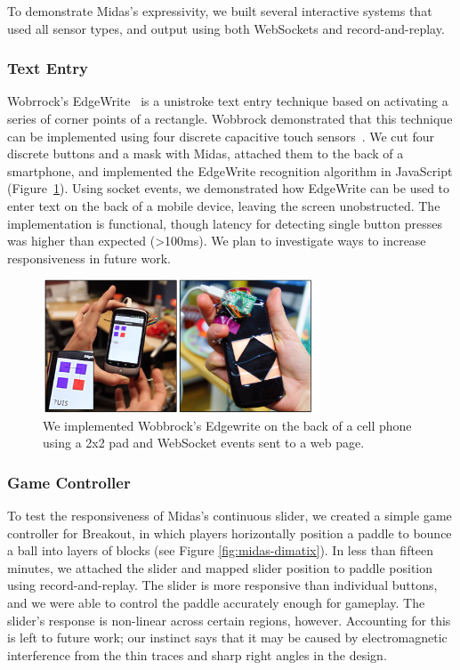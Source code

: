     To demonstrate Midas's expressivity, we built several interactive systems that used all sensor types, and output using both WebSockets and record-and-replay.
    
        \subsubsection{Text Entry}
Wobrrock's EdgeWrite~\cite{wobbrock-edgewrite} is a unistroke text entry technique based on activating a series of corner points of a rectangle. Wobbrock demonstrated that this technique can be implemented using four discrete capacitive touch sensors~\cite{edgewrite-cap}. We cut four discrete buttons and a mask with Midas, attached them to the back of a smartphone, and implemented the EdgeWrite recognition algorithm in JavaScript (Figure~\ref{fig:midas-edgewrite}). Using socket events, we demonstrated how EdgeWrite can be used to enter text on the back of a mobile device, leaving the screen unobstructed. The implementation is functional, though latency for detecting single button presses was higher than expected (\textgreater 100ms). We plan to investigate ways to increase responsiveness in future work.

\begin{figure}[t]
\centering
\includegraphics[width=3.25in]{figures/midas/edgewrite.jpg}
\caption{We implemented Wobbrock's Edgewrite on the back of a cell phone using a 2x2 pad and WebSocket events sent to a web page.} 
\label{fig:midas-edgewrite}
\end{figure}

        \subsubsection{Game Controller}
To test the responsiveness of Midas's continuous slider, we created a simple game controller for Breakout, in which players horizontally position a paddle to bounce a ball into layers of blocks (see Figure \ref{fig:midas-dimatix}). In less than fifteen minutes, we attached the slider and mapped slider position to paddle position using record-and-replay.
The slider is more responsive than individual buttons, and we were able to control the paddle accurately enough for gameplay.  The slider's response is non-linear across certain regions, however. Accounting for this is left to future work; our instinct says that it may be caused by electromagnetic interference from the thin traces and sharp right angles in the design.

